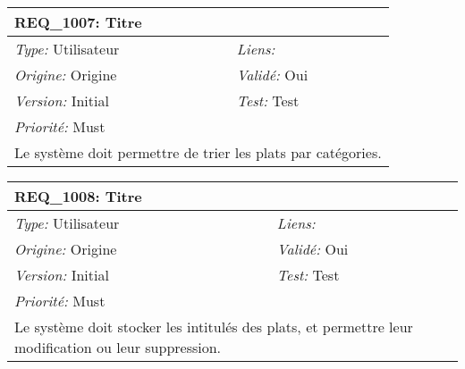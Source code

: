 \begin{table}[!h]

\begin{tabular}{|p{60mm}p{100mm}|}

\hline

\multicolumn{2}{|l|}{\textbf{REQ\_1007:} Titre} \\ \hline

\emph{Type:} Utilisateur & \emph{Liens:}  \\

\emph{Origine:} Origine & \emph{Validé:} Oui \\

\emph{Version:} Initial & \emph{Test:} Test \\

\emph{Priorité:} Must & \\ \hline

\multicolumn{2}{|p{16cm}|}{Le système doit permettre de trier les plats par catégories.} \\ \hline

\end{tabular}

\end{table}



\begin{table}[!h]

\begin{tabular}{|p{60mm}p{100mm}|}

\hline

\multicolumn{2}{|l|}{\textbf{REQ\_1008:} Titre} \\ \hline

\emph{Type:} Utilisateur & \emph{Liens:}  \\

\emph{Origine:} Origine & \emph{Validé:} Oui \\

\emph{Version:} Initial & \emph{Test:} Test \\

\emph{Priorité:} Must & \\ \hline

\multicolumn{2}{|p{16cm}|}{Le système doit stocker les intitulés des plats, et permettre leur modification ou leur suppression.} \\ \hline

\end{tabular}

\end{table}



